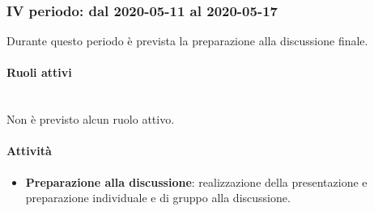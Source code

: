\subsubsection{IV periodo: dal 2020-05-11 al 2020-05-17}
Durante questo periodo è prevista la preparazione alla discussione finale.
\paragraph{Ruoli attivi} \mbox{}\\ [1mm]
Non è previsto alcun ruolo attivo.
\paragraph{Attività}
\begin{itemize}
	\item \textbf{Preparazione alla discussione}: realizzazione della presentazione e preparazione individuale e di gruppo alla discussione.
\end{itemize}

